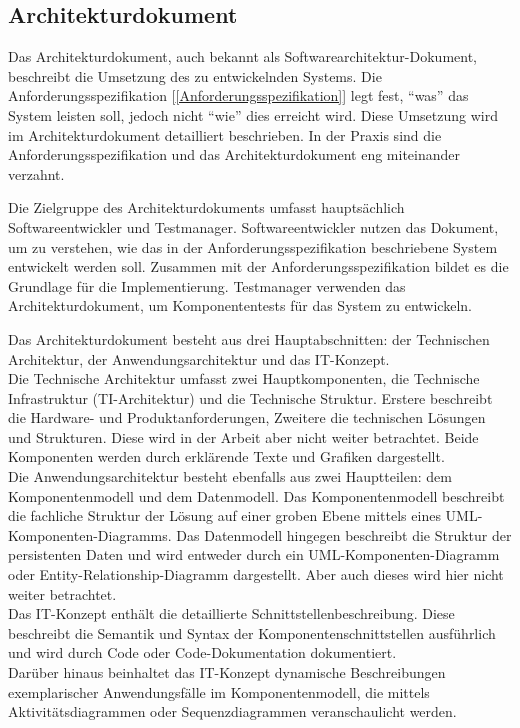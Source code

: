 \subsection{Architekturdokument}  \label{Architekturdokument}

Das Architekturdokument, auch bekannt als Softwarearchitektur-Dokument, beschreibt die Umsetzung des zu entwickelnden 
Systems. Die Anforderungsspezifikation [\ref{Anforderungsspezifikation}] legt fest, ``was'' das System leisten soll, 
jedoch nicht ``wie'' dies erreicht wird. Diese Umsetzung wird im Architekturdokument detailliert beschrieben. In der 
Praxis sind die Anforderungsspezifikation und das Architekturdokument eng miteinander verzahnt.

Die Zielgruppe des Architekturdokuments umfasst hauptsächlich Softwareentwickler und Testmanager. Softwareentwickler 
nutzen das Dokument, um zu verstehen, wie das in der Anforderungsspezifikation beschriebene System entwickelt werden 
soll. Zusammen mit der Anforderungsspezifikation bildet es die Grundlage für die Implementierung. Testmanager verwenden 
das Architekturdokument, um Komponententests für das System zu entwickeln.

Das Architekturdokument besteht aus drei Hauptabschnitten: der Technischen Architektur, der Anwendungsarchitektur 
und das IT-Konzept.\\
Die Technische Architektur umfasst zwei Hauptkomponenten, die Technische Infrastruktur (TI-Architektur) und die Technische 
Struktur. Erstere beschreibt die Hardware- und Produktanforderungen, Zweitere die technischen Lösungen und Strukturen. 
Diese wird in der Arbeit aber nicht weiter betrachtet. Beide Komponenten werden durch erklärende Texte und Grafiken dargestellt.\\
Die Anwendungsarchitektur besteht ebenfalls aus zwei Hauptteilen: dem Komponentenmodell und dem Datenmodell. Das 
Komponentenmodell beschreibt die fachliche Struktur der Lösung auf einer groben Ebene mittels eines 
UML-Komponenten-Diagramms. Das Datenmodell hingegen beschreibt die Struktur der persistenten Daten und wird 
entweder durch ein UML-Komponenten-Diagramm oder Entity-Relationship-Diagramm dargestellt. Aber auch dieses wird hier 
nicht weiter betrachtet.\\
Das IT-Konzept enthält die detaillierte Schnittstellenbeschreibung. Diese beschreibt die Semantik und Syntax der 
Komponentenschnittstellen ausführlich und wird durch Code oder Code-Dokumentation dokumentiert.\\ 
Darüber hinaus beinhaltet das IT-Konzept dynamische Beschreibungen exemplarischer Anwendungsfälle im Komponentenmodell, die mittels 
Aktivitätsdiagrammen oder Sequenzdiagrammen veranschaulicht werden.

